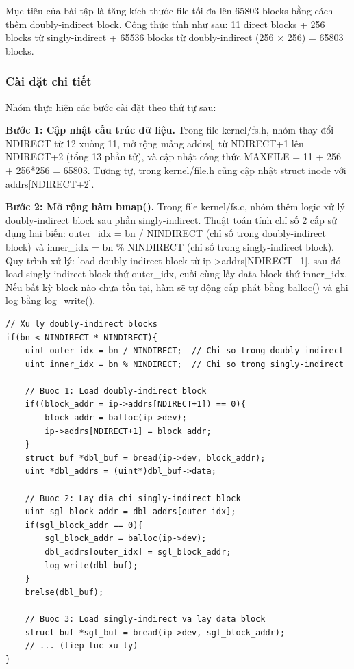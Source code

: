 \documentclass[12pt,a4paper]{article}
\begin{document}
Mục tiêu của bài tập là tăng kích thước file tối đa lên 65803 blocks bằng cách thêm doubly-indirect block. Công thức tính như sau: 11 direct blocks + 256 blocks từ singly-indirect + 65536 blocks từ doubly-indirect (256 × 256) = 65803 blocks.

\subsubsection{Cài đặt chi tiết}

Nhóm thực hiện các bước cài đặt theo thứ tự sau:

\textbf{Bước 1: Cập nhật cấu trúc dữ liệu.} Trong file kernel/fs.h, nhóm thay đổi NDIRECT từ 12 xuống 11, mở rộng mảng addrs[] từ NDIRECT+1 lên NDIRECT+2 (tổng 13 phần tử), và cập nhật công thức MAXFILE = 11 + 256 + 256*256 = 65803. Tương tự, trong kernel/file.h cũng cập nhật struct inode với addrs[NDIRECT+2].

\textbf{Bước 2: Mở rộng hàm bmap().} Trong file kernel/fs.c, nhóm thêm logic xử lý doubly-indirect block sau phần singly-indirect. Thuật toán tính chỉ số 2 cấp sử dụng hai biến: outer\_idx = bn / NINDIRECT (chỉ số trong doubly-indirect block) và inner\_idx = bn \% NINDIRECT (chỉ số trong singly-indirect block). Quy trình xử lý: load doubly-indirect block từ ip->addrs[NDIRECT+1], sau đó load singly-indirect block thứ outer\_idx, cuối cùng lấy data block thứ inner\_idx. Nếu bất kỳ block nào chưa tồn tại, hàm sẽ tự động cấp phát bằng balloc() và ghi log bằng log\_write().

\begin{lstlisting}[caption={Xử lý doubly-indirect block trong bmap()}]
// Xu ly doubly-indirect blocks
if(bn < NINDIRECT * NINDIRECT){
    uint outer_idx = bn / NINDIRECT;  // Chi so trong doubly-indirect
    uint inner_idx = bn % NINDIRECT;  // Chi so trong singly-indirect
    
    // Buoc 1: Load doubly-indirect block
    if((block_addr = ip->addrs[NDIRECT+1]) == 0){
        block_addr = balloc(ip->dev);
        ip->addrs[NDIRECT+1] = block_addr;
    }
    struct buf *dbl_buf = bread(ip->dev, block_addr);
    uint *dbl_addrs = (uint*)dbl_buf->data;
    
    // Buoc 2: Lay dia chi singly-indirect block
    uint sgl_block_addr = dbl_addrs[outer_idx];
    if(sgl_block_addr == 0){
        sgl_block_addr = balloc(ip->dev);
        dbl_addrs[outer_idx] = sgl_block_addr;
        log_write(dbl_buf);
    }
    brelse(dbl_buf);
    
    // Buoc 3: Load singly-indirect va lay data block
    struct buf *sgl_buf = bread(ip->dev, sgl_block_addr);
    // ... (tiep tuc xu ly)
}
\end{lstlisting}
\end{document}
